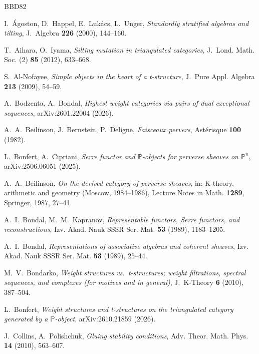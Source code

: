 \documentclass[11pt,reqno]{amsart}
\theoremstyle{plain}
\theoremstyle{definition}
\theoremstyle{remark}
\begin{document}
\begin{thebibliography}{BBD82}

I.~\'Agoston, D.~Happel, E.~Luk\'acs, L.~Unger, \emph{Standardly stratified algebras and tilting}, J.~Algebra \textbf{226} (2000), 144--160.

T.~Aihara, O.~Iyama, \emph{Silting mutation in triangulated categories}, J.~Lond. Math. Soc. (2) \textbf{85} (2012), 633--668.

S.~Al-Nofayee, \emph{Simple objects in the heart of a t-structure}, J.~Pure Appl. Algebra \textbf{213} (2009), 54--59.

A.~Bodzenta, A.~Bondal, \emph{Highest weight categories via pairs of dual exceptional sequences}, arXiv:2601.22004 (2026).

A.~A.~Beilinson, J.~Bernstein, P.~Deligne, \emph{Faisceaux pervers}, Ast\'erisque \textbf{100} (1982).

L.~Bonfert, A.~Cipriani, \emph{Serre functor and $\mathbb{P}$-objects for perverse sheaves on $\mathbb{P}^n$}, arXiv:2506.06051 (2025).

A.~A.~Beilinson, \emph{On the derived category of perverse sheaves}, in: K-theory, arithmetic and geometry (Moscow, 1984--1986), Lecture Notes in Math. \textbf{1289}, Springer, 1987, 27--41.

A.~I.~Bondal, M.~M.~Kapranov, \emph{Representable functors, Serre functors, and reconstructions}, Izv. Akad. Nauk SSSR Ser. Mat. \textbf{53} (1989), 1183--1205.

A.~I.~Bondal, \emph{Representations of associative algebras and coherent sheaves}, Izv. Akad. Nauk SSSR Ser. Mat. \textbf{53} (1989), 25--44.

M.~V.~Bondarko, \emph{Weight structures vs.\ t-structures; weight filtrations, spectral sequences, and complexes (for motives and in general)}, J.~K-Theory \textbf{6} (2010), 387--504.

L.~Bonfert, \emph{Weight structures and t-structures on the triangulated category generated by a $\mathbb{P}$-object}, arXiv:2610.21859 (2026).

J.~Collins, A.~Polishchuk, \emph{Gluing stability conditions}, Adv. Theor. Math. Phys. \textbf{14} (2010), 563--607.


\end{thebibliography}
\end{document}

